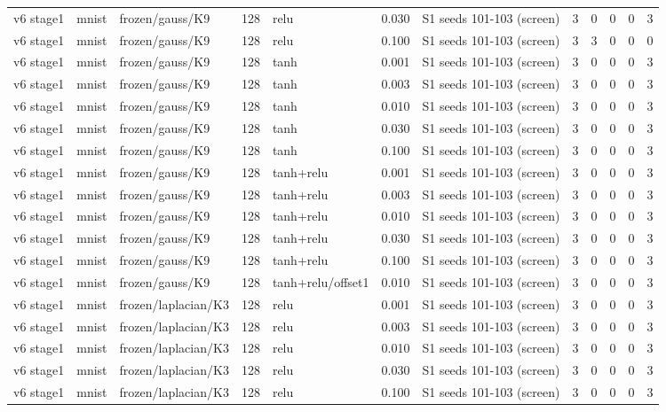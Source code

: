 \begin{table}[htbp]
{\begin{tabular}{@{}lllrlrlrrrrr@{}}
v6 stage1 & mnist & frozen/gauss/K9 & 128 & relu & 0.030 & S1 seeds 101-103 (screen) & 3 & 0 & 0 & 0 & 3 \\
v6 stage1 & mnist & frozen/gauss/K9 & 128 & relu & 0.100 & S1 seeds 101-103 (screen) & 3 & 3 & 0 & 0 & 0 \\
v6 stage1 & mnist & frozen/gauss/K9 & 128 & tanh & 0.001 & S1 seeds 101-103 (screen) & 3 & 0 & 0 & 0 & 3 \\
v6 stage1 & mnist & frozen/gauss/K9 & 128 & tanh & 0.003 & S1 seeds 101-103 (screen) & 3 & 0 & 0 & 0 & 3 \\
v6 stage1 & mnist & frozen/gauss/K9 & 128 & tanh & 0.010 & S1 seeds 101-103 (screen) & 3 & 0 & 0 & 0 & 3 \\
v6 stage1 & mnist & frozen/gauss/K9 & 128 & tanh & 0.030 & S1 seeds 101-103 (screen) & 3 & 0 & 0 & 0 & 3 \\
v6 stage1 & mnist & frozen/gauss/K9 & 128 & tanh & 0.100 & S1 seeds 101-103 (screen) & 3 & 0 & 0 & 0 & 3 \\
v6 stage1 & mnist & frozen/gauss/K9 & 128 & tanh+relu & 0.001 & S1 seeds 101-103 (screen) & 3 & 0 & 0 & 0 & 3 \\
v6 stage1 & mnist & frozen/gauss/K9 & 128 & tanh+relu & 0.003 & S1 seeds 101-103 (screen) & 3 & 0 & 0 & 0 & 3 \\
v6 stage1 & mnist & frozen/gauss/K9 & 128 & tanh+relu & 0.010 & S1 seeds 101-103 (screen) & 3 & 0 & 0 & 0 & 3 \\
v6 stage1 & mnist & frozen/gauss/K9 & 128 & tanh+relu & 0.030 & S1 seeds 101-103 (screen) & 3 & 0 & 0 & 0 & 3 \\
v6 stage1 & mnist & frozen/gauss/K9 & 128 & tanh+relu & 0.100 & S1 seeds 101-103 (screen) & 3 & 0 & 0 & 0 & 3 \\
v6 stage1 & mnist & frozen/gauss/K9 & 128 & tanh+relu/offset1 & 0.010 & S1 seeds 101-103 (screen) & 3 & 0 & 0 & 0 & 3 \\
v6 stage1 & mnist & frozen/laplacian/K3 & 128 & relu & 0.001 & S1 seeds 101-103 (screen) & 3 & 0 & 0 & 0 & 3 \\
v6 stage1 & mnist & frozen/laplacian/K3 & 128 & relu & 0.003 & S1 seeds 101-103 (screen) & 3 & 0 & 0 & 0 & 3 \\
v6 stage1 & mnist & frozen/laplacian/K3 & 128 & relu & 0.010 & S1 seeds 101-103 (screen) & 3 & 0 & 0 & 0 & 3 \\
v6 stage1 & mnist & frozen/laplacian/K3 & 128 & relu & 0.030 & S1 seeds 101-103 (screen) & 3 & 0 & 0 & 0 & 3 \\
v6 stage1 & mnist & frozen/laplacian/K3 & 128 & relu & 0.100 & S1 seeds 101-103 (screen) & 3 & 0 & 0 & 0 & 3 \\

\end{tabular}}
\end{table}
